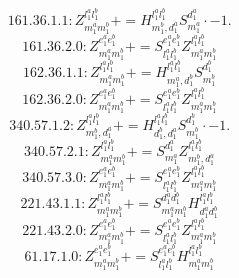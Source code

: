 \documentclass[letterpaper,10pt,fleqn,leqno,onecolumn]{article}
\begin{document}
\begin{equation} \;\;\;\;\;\;  161.36.1.1: Z^{l_{1}^{a}l_{1}^{b}}_{m_{1}^{a}m_{1}^{b}}+=H^{l_{1}^{a}l_{1}^{b}}_{m_{1}^{b},d_{1}^{a}}S^{d_{1}^{a}}_{m_{1}^{a}}\cdot -1. \end{equation}
\begin{equation} \;\;\;\;\;\;  161.36.2.0: Z^{e_{1}^{a}e_{1}^{b}}_{m_{1}^{a}m_{1}^{b}}+=S^{e_{1}^{a}e_{1}^{b}}_{l_{1}^{a}l_{1}^{b}}Z^{l_{1}^{a}l_{1}^{b}}_{m_{1}^{a}m_{1}^{b}} \end{equation}
\begin{equation} \;\;\;\;\;\;  162.36.1.1: Z^{l_{1}^{a}l_{1}^{b}}_{m_{1}^{a}m_{1}^{b}}+=H^{l_{1}^{a}l_{1}^{b}}_{m_{1}^{a},d_{1}^{b}}S^{d_{1}^{b}}_{m_{1}^{b}} \end{equation}
\begin{equation} \;\;\;\;\;\;  162.36.2.0: Z^{e_{1}^{a}e_{1}^{b}}_{m_{1}^{a}m_{1}^{b}}+=S^{e_{1}^{a}e_{1}^{b}}_{l_{1}^{a}l_{1}^{b}}Z^{l_{1}^{a}l_{1}^{b}}_{m_{1}^{a}m_{1}^{b}} \end{equation}
\begin{equation} \;\;\;\;\;\;  340.57.1.2: Z^{l_{1}^{a}l_{1}^{b}}_{m_{1}^{b},d_{1}^{a}}+=H^{l_{1}^{a}l_{1}^{b}}_{d_{1}^{b},d_{1}^{a}}S^{d_{1}^{b}}_{m_{1}^{b}}\cdot -1. \end{equation}
\begin{equation} \;\;\;\;\;\;  340.57.2.1: Z^{l_{1}^{a}l_{1}^{b}}_{m_{1}^{a}m_{1}^{b}}+=S^{d_{1}^{a}}_{m_{1}^{a}}Z^{l_{1}^{a}l_{1}^{b}}_{m_{1}^{b},d_{1}^{a}} \end{equation}
\begin{equation} \;\;\;\;\;\;  340.57.3.0: Z^{e_{1}^{a}e_{1}^{b}}_{m_{1}^{a}m_{1}^{b}}+=S^{e_{1}^{a}e_{1}^{b}}_{l_{1}^{a}l_{1}^{b}}Z^{l_{1}^{a}l_{1}^{b}}_{m_{1}^{a}m_{1}^{b}} \end{equation}
\begin{equation} \;\;\;\;\;\;  221.43.1.1: Z^{l_{1}^{a}l_{1}^{b}}_{m_{1}^{a}m_{1}^{b}}+=S^{d_{1}^{a}d_{1}^{b}}_{m_{1}^{a}m_{1}^{b}}H^{l_{1}^{a}l_{1}^{b}}_{d_{1}^{a}d_{1}^{b}} \end{equation}
\begin{equation} \;\;\;\;\;\;  221.43.2.0: Z^{e_{1}^{a}e_{1}^{b}}_{m_{1}^{a}m_{1}^{b}}+=S^{e_{1}^{a}e_{1}^{b}}_{l_{1}^{a}l_{1}^{b}}Z^{l_{1}^{a}l_{1}^{b}}_{m_{1}^{a}m_{1}^{b}} \end{equation}
\begin{equation} \;\;\;\;\;\;  61.17.1.0: Z^{e_{1}^{a}e_{1}^{b}}_{m_{1}^{a}m_{1}^{b}}+=S^{e_{1}^{a}e_{1}^{b}}_{l_{1}^{a}l_{1}^{b}}H^{l_{1}^{a}l_{1}^{b}}_{m_{1}^{a}m_{1}^{b}} \end{equation}
\end{document}
